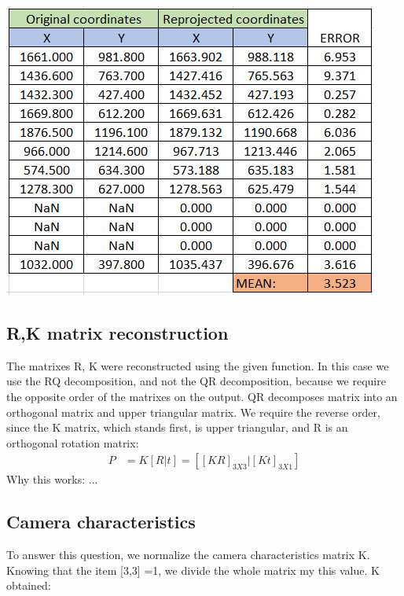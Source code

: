 \documentclass[a4paper]{iacas}
\begin{document}

\vskip 0.1in
\begin{minipage}{\linewidth}
	\centering
	\includegraphics[scale=1]{goal_res/errors_table.png}
	\label{fig_1}
\end{minipage}
\vskip 0.1in



\subsection{R,K matrix reconstruction}
The matrixes R, K were reconstructed using the given function. 
\newline
In this case we use the RQ decomposition, and not the QR decomposition, because we require the opposite order of the matrixes on the output. QR decomposes matrix into an orthogonal matrix and upper triangular matrix. We require the reverse order, since the K matrix, which stands first, is upper triangular, and R is an orthogonal rotation matrix:
\begin{align*}
P &= K [ R | t ] = [[KR]_{3X3} | [Kt]_{3X1} ]
\end{align*}
Why this works:
\newline
...

\subsection{Camera characteristics}
To answer this question, we normalize the camera characteristics matrix K. Knowing that the item [3,3] =1, we divide the whole matrix my this value. K obtained:
\end{document}
